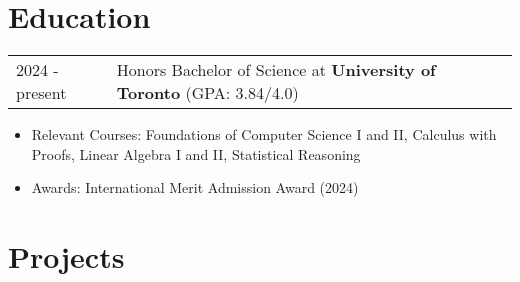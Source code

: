 \documentclass[a4paper,10pt]{article} %
\begin{document}
\section{Education}
\begin{tabularx}{\linewidth}{@{}l X@{}}
    2024 - present & Honors Bachelor of Science at \textbf{University of Toronto} \hfill \normalsize (GPA: 3.84/4.0) \\
\end{tabularx}
\begin{itemize}
    \item Relevant Courses: Foundations of Computer Science I and II, Calculus with Proofs, Linear Algebra I and II, Statistical Reasoning
    \item Awards: International Merit Admission Award (2024)
\end{itemize}

  
\section{Projects}
\end{document}
